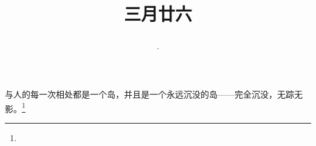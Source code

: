 \title{\date[d=4,m=5,y=2024][year:cn-y,年,month:cn,day:cn,日,·,weekday]·三月廿六 }
与人的每一次相处都是一个岛，并且是一个永远沉没的岛——完全沉没，无踪无影。\footnote{ }

